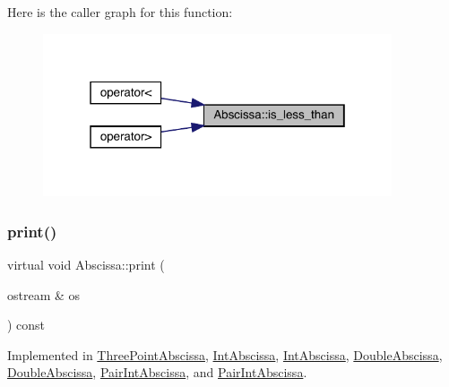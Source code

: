 Here is the caller graph for this function\+:
\nopagebreak
\begin{figure}[H]
\begin{center}
\leavevmode
\includegraphics[width=292pt]{dd/db2/classAbscissa_a399c2f7a1309368b477c767ff5f63927_icgraph}
\end{center}
\end{figure}
\mbox{\label{classAbscissa_a98e122d32d82979bd30338abc15768fd}} 
\subsubsection{\texorpdfstring{print()}{print()}\hspace{0.1cm}{\footnotesize\ttfamily [1/2]}}
{\footnotesize\ttfamily virtual void Abscissa\+::print (\begin{DoxyParamCaption}\item[{ostream \&}]{os }\end{DoxyParamCaption}) const\hspace{0.3cm}{\ttfamily [pure virtual]}}



Implemented in \mbox{\hyperlink{classThreePointAbscissa_aa312b658c93628deb092f769246707af}{Three\+Point\+Abscissa}}, \mbox{\hyperlink{classIntAbscissa_af26b6be609db09fbe544502b6606cff8}{Int\+Abscissa}}, \mbox{\hyperlink{classIntAbscissa_af26b6be609db09fbe544502b6606cff8}{Int\+Abscissa}}, \mbox{\hyperlink{classDoubleAbscissa_a164c2a9d56e6c9454069c70d6593a39b}{Double\+Abscissa}}, \mbox{\hyperlink{classDoubleAbscissa_a164c2a9d56e6c9454069c70d6593a39b}{Double\+Abscissa}}, \mbox{\hyperlink{classPairIntAbscissa_aab7471f83b36cb5a16212902a30d8ce2}{Pair\+Int\+Abscissa}}, and \mbox{\hyperlink{classPairIntAbscissa_aab7471f83b36cb5a16212902a30d8ce2}{Pair\+Int\+Abscissa}}.

